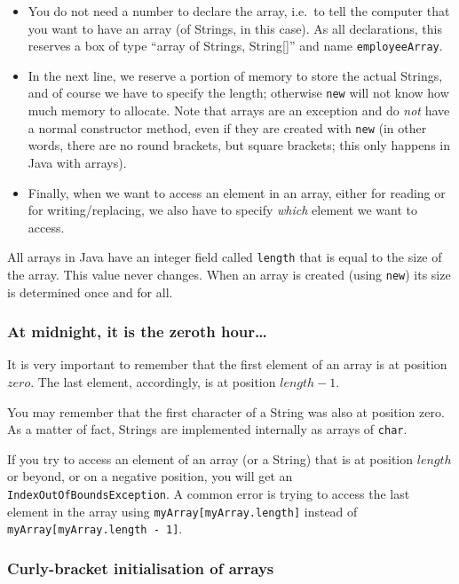 \begin{itemize}
\item You do not need a number to declare the array, i.e.~to tell the
  computer that you want to have an array (of Strings, in this
  case). As all declarations, this reserves a box of type ``array of
  Strings, String[]'' and name \verb+employeeArray+.
\item In the next line, we reserve a portion of memory to store the
  actual Strings, and of course we have to specify the length;
  otherwise \verb+new+ will not know how much memory to allocate. Note
  that arrays are an exception and do \emph{not} have a normal
  constructor method, even if they are created with \verb+new+ (in
  other words, there are no round brackets, but square brackets; this
  only happens in Java with arrays). 
\item Finally, when we want to access an element in an array, either
  for reading or for writing/replacing, we also have to specify
  \emph{which} element we want to access.
\end{itemize}

All arrays in Java have an integer field called \verb+length+ that is equal to
the size of the array. This value never changes. When an array is
created (using \verb+new+) its size is determined once and for all. 

\subsubsection*{At midnight, it is the zeroth hour\ldots}
\label{sec:at-midnight-it}

It is very important to remember that the first element of an array is
at position $zero$. The last element, accordingly, is at position 
$length - 1$. 

You may remember that the first character of a String was also at
position zero. As a matter of fact, Strings are implemented internally
as arrays of \verb+char+. 

If you try to access an element of an array (or a String) that is at
position $length$ or beyond, or on a negative position, you will get
an \verb+IndexOutOfBoundsException+. A common error is trying to
access the last element in the array using
\verb+myArray[myArray.length]+ instead 
of \verb+myArray[myArray.length - 1]+.

\subsubsection*{Curly-bracket initialisation of arrays}
\label{sec:curly-brack-init}

